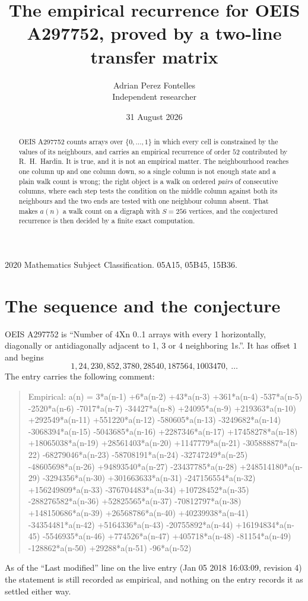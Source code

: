 \documentclass[11pt,a4paper]{article}
\title{The empirical recurrence for OEIS A297752, proved by a two-line transfer matrix}
\author{Adrian Perez Fontelles\\ \small Independent researcher}
\date{31 August 2026}
\theoremstyle{plain}
\theoremstyle{definition}
\begin{document}
\maketitle

\begin{abstract}
OEIS A297752 counts arrays over $\{0,\dots,1\}$ in which every cell is constrained by the
values of its neighbours, and carries an empirical recurrence of order $52$ contributed
by R.~H.~Hardin. It is true, and it is not an empirical matter. The neighbourhood reaches one
column up and one column down, so a single column is not enough state and a plain walk count
is wrong; the right object is a walk on ordered \emph{pairs} of consecutive columns, where
each step tests the condition on the middle column against both its neighbours and the two
ends are tested with one neighbour column absent. That makes $a(n)$ a walk count on a digraph
with $S=256$ vertices, and the conjectured recurrence is then decided by a finite exact
computation.
\end{abstract}

\noindent\small 2020 Mathematics Subject Classification. 05A15, 05B45, 15B36.\normalsize

\section{The sequence and the conjecture}

OEIS A297752 is ``Number of 4Xn 0..1 arrays with every 1 horizontally, diagonally or antidiagonally adjacent to 1, 3 or 4 neighboring 1s.''. It has offset $1$ and begins
\[
1, 24, 230, 852, 3780, 28540, 187564, 1003470,\ \dots
\]
The entry carries the following comment:
\begin{quote}\small
Empirical: a(n) = 3*a(n-1) +6*a(n-2) +43*a(n-3) +361*a(n-4) -537*a(n-5) -2520*a(n-6) -7017*a(n-7) -34427*a(n-8) +24095*a(n-9) +219363*a(n-10) +292549*a(n-11) +551220*a(n-12) -580605*a(n-13) -3249682*a(n-14) -3068394*a(n-15) -5043685*a(n-16) +2287346*a(n-17) +17458278*a(n-18) +18065038*a(n-19) +28561403*a(n-20) +1147779*a(n-21) -30588887*a(n-22) -68279046*a(n-23) -58708191*a(n-24) -32747249*a(n-25) -48605698*a(n-26) +94893540*a(n-27) -23437785*a(n-28) +248514180*a(n-29) -3294356*a(n-30) +301663633*a(n-31) -247156554*a(n-32) +156249809*a(n-33) -376704483*a(n-34) +10728452*a(n-35) -288276582*a(n-36) +52825565*a(n-37) -70812797*a(n-38) +148150686*a(n-39) +26568786*a(n-40) +40239938*a(n-41) -34354481*a(n-42) +5164336*a(n-43) -20755892*a(n-44) +16194834*a(n-45) -5546935*a(n-46) +774526*a(n-47) +405718*a(n-48) -81154*a(n-49) -128862*a(n-50) +29288*a(n-51) -96*a(n-52)
\end{quote}
As of the ``Last modified'' line on the live entry (Jan 05 2018 16:03:09, revision 4) the statement is
still recorded as empirical, and nothing on the entry records it as settled either way.
\end{document}
